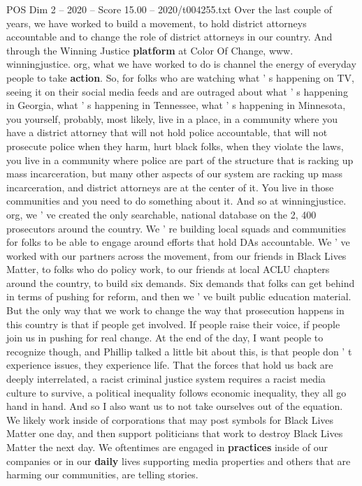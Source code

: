 \begin{textsample}{POS Dim 2 – 2020 – Score 15.00 – 2020/t004255.txt}
Over the last couple of years, we have worked to build a movement, to hold district attorneys accountable and to change the role of district attorneys in our country.
And through the Winning Justice \textbf{platform} at Color Of Change, www. winningjustice. org, what we have worked to do is channel the energy of everyday people to take \textbf{action}.
So, for folks who are watching what ' s happening on TV, seeing it on their social media feeds and are outraged about what ' s happening in Georgia, what ' s happening in Tennessee, what ' s happening in Minnesota, you yourself, probably, most likely, live in a place, in a community where you have a district attorney that will not hold police accountable, that will not prosecute police when they harm, hurt black folks, when they violate the laws, you live in a community where police are part of the structure that is racking up mass incarceration, but many other aspects of our system are racking up mass incarceration, and district attorneys are at the center of it.
You live in those communities and you need to do something about it.
And so at winningjustice. org, we ' ve created the only searchable, national database on the 2, 400 prosecutors around the country.
We ' re building local squads and communities for folks to be able to engage around efforts that hold DAs accountable.
We ' ve worked with our partners across the movement, from our friends in Black Lives Matter, to folks who do policy work, to our friends at local ACLU chapters around the country, to build six demands.
Six demands that folks can get behind in terms of pushing for reform, and then we ' ve built public education material.
But the only way that we work to change the way that prosecution happens in this country is that if people get involved.
If people raise their voice, if people join us in pushing for real change.
At the end of the day, I want people to recognize though, and Phillip talked a little bit about this, is that people don ' t experience issues, they experience life.
That the forces that hold us back are deeply interrelated, a racist criminal justice system requires a racist media culture to survive, a political inequality follows economic inequality, they all go hand in hand.
And so I also want us to not take ourselves out of the equation.
We likely work inside of corporations that may post symbols for Black Lives Matter one day, and then support politicians that work to destroy Black Lives Matter the next day.
We oftentimes are engaged in \textbf{practices} inside of our companies or in our \textbf{daily} lives supporting media properties and others that are harming our communities, are telling stories.

\end{textsample}
